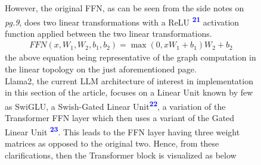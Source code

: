 \documentclass[12pt]{article}
\newcommand{\sidecite}[1]{\textsuperscript{\textcolor{blue}{\textbf{\scriptsize#1}}}}
\begin{document}
\begin{figure}[!htb]
    \begin{minipage}[t]{0.65\textwidth}
    \raggedright
    However, the original FFN, as can be seen from the side notes 
    on {\it pg.9}, does two linear transformations with a 
    ReLU \sidecite{21} activation function applied between the two 
    linear transformations.
    \begin{align*}
        FFN(x, W_1, W_2, b_1, b_2) = \max(0, xW_1 + b_1)W_2 + b_2
    \end{align*}
    the above equation being representative of the graph computation in the 
    linear topology on the just aforementioned page.\\
    Llama2, the current LLM architecture of interest in implementation in this 
    section of the article, 
    focuses on a Linear Unit known by few as SwiGLU, a Swish-Gated Linear Unit\sidecite{22}, 
    a variation of the Transformer FFN layer which then uses a variant of the 
    Gated Linear Unit \sidecite{23}.
    This leads to the FFN layer having three weight matrices as opposed to the original two.
    Hence, from these clarifications, then the Transformer block is visualized as below
\end{minipage}
\end{figure}
\end{document}
